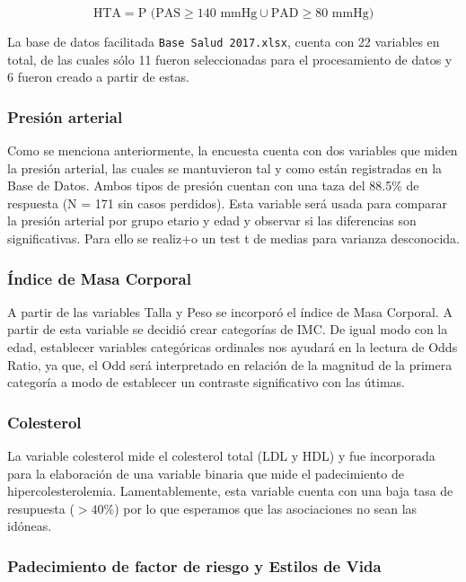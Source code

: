 \documentclass{aa}
\begin{document}
$$ \textrm{HTA} =  \textrm{P (PAS} \geq 140 \textrm{ mmHg} \cup \textrm{PAD} \geq 80 \textrm{ mmHg)}$$

La base de datos facilitada \texttt{Base Salud 2017.xlsx}, cuenta con 22 variables en total, de las cuales sólo 11 fueron seleccionadas para el procesamiento de datos y 6 fueron creado a partir de estas.

\subsubsection{Presión arterial}

Como se menciona anteriormente, la encuesta cuenta con dos variables que miden la presión arterial, las cuales se mantuvieron tal y como están registradas en la Base de Datos. Ambos tipos de presión cuentan con una taza del 88.5\%  de respuesta (N = 171 sin casos perdidos). Esta variable será usada para comparar la presión arterial por grupo etario y edad y observar si las diferencias son significativas. Para ello se realiz+o un test t de medias para varianza desconocida.

\subsubsection{Índice de Masa Corporal}

A partir de las variables Talla y Peso se incorporó el índice de Masa Corporal. A partir de esta variable se decidió crear categorías de IMC. De igual modo con la edad, establecer variables categóricas ordinales nos ayudará en la lectura de Odds Ratio, ya que, el Odd será interpretado en relación de la magnitud de la primera categoría a modo de establecer un contraste significativo con las útimas.

\subsubsection{Colesterol}

La variable colesterol mide el colesterol total (LDL y HDL) y fue incorporada para la elaboración de una variable binaria que mide el padecimiento de hipercolesterolemia. Lamentablemente, esta variable cuenta con una baja tasa de resupuesta ($> 40\%$) por lo que esperamos que las asociaciones no sean las idóneas.

\subsubsection{Padecimiento de factor de riesgo y Estilos de Vida}
\end{document}
